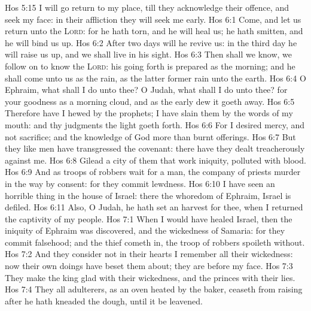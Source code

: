 \vs Hos 5:15 I will go  return to my place, till they acknowledge their offence, and seek my face: in their affliction they will seek me early.
\vs Hos 6:1 Come, and let us return unto the \textsc{Lord}: for he hath torn, and he will heal us; he hath smitten, and he will bind us up.
\vs Hos 6:2 After two days will he revive us: in the third day he will raise us up, and we shall live in his sight.
\vs Hos 6:3 Then shall we know,  we follow on to know the \textsc{Lord}: his going forth is prepared as the morning; and he shall come unto us as the rain, as the latter  former rain unto the earth.
\vs Hos 6:4 O Ephraim, what shall I do unto thee? O Judah, what shall I do unto thee? for your goodness  as a morning cloud, and as the early dew it goeth away.
\vs Hos 6:5 Therefore have I hewed  by the prophets; I have slain them by the words of my mouth: and thy judgments  the light  goeth forth.
\vs Hos 6:6 For I desired mercy, and not sacrifice; and the knowledge of God more than burnt offerings.
\vs Hos 6:7 But they like men have transgressed the covenant: there have they dealt treacherously against me.
\vs Hos 6:8 Gilead  a city of them that work iniquity,  polluted with blood.
\vs Hos 6:9 And as troops of robbers wait for a man,  the company of priests murder in the way by consent: for they commit lewdness.
\vs Hos 6:10 I have seen an horrible thing in the house of Israel: there  the whoredom of Ephraim, Israel is defiled.
\vs Hos 6:11 Also, O Judah, he hath set an harvest for thee, when I returned the captivity of my people.
\vs Hos 7:1 When I would have healed Israel, then the iniquity of Ephraim was discovered, and the wickedness of Samaria: for they commit falsehood; and the thief cometh in,  the troop of robbers spoileth without.
\vs Hos 7:2 And they consider not in their hearts  I remember all their wickedness: now their own doings have beset them about; they are before my face.
\vs Hos 7:3 They make the king glad with their wickedness, and the princes with their lies.
\vs Hos 7:4 They  all adulterers, as an oven heated by the baker,  ceaseth from raising after he hath kneaded the dough, until it be leavened.
